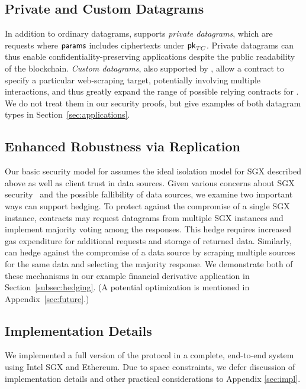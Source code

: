 \subsection{Private and Custom Datagrams}
\label{subsec:private_datagrams}
In addition to ordinary datagrams, \tc supports \emph{private datagrams}, which are requests where ${\sf params}$ includes ciphertexts under ${\sf pk}_{TC}$. Private datagrams can thus enable confidentiality-preserving applications despite the public readability of the blockchain.  \emph{Custom datagrams}, also supported by \tc, allow a contract to specify a particular web-scraping target, potentially involving multiple interactions, and thus greatly expand the range of possible relying contracts for \tc. We do not treat them in our security proofs, but give examples of both datagram types in Section~\ref{sec:applications}.

\subsection{Enhanced Robustness via Replication}
\label{subsec:enhanced_robustness}
Our basic security model for \tc assumes the ideal isolation model for SGX described above as well as client trust in data sources. Given various concerns about SGX security~\cite{sgxexplained,7163052} and the possible fallibility of data sources, we examine two important ways \tc can support hedging.
To protect against the compromise of a single SGX instance, contracts may request datagrams from multiple SGX instances and implement majority voting among the responses.
This hedge requires increased gas expenditure for additional requests and storage of returned data.
Similarly, \tc can hedge against the compromise of a data source by scraping multiple sources for the same data and selecting the majority response. We demonstrate both of these mechanisms in our example financial derivative application in Section~\ref{subsec:hedging}. (A potential optimization is mentioned in Appendix~\ref{sec:future}.)


\subsection{Implementation Details}
We implemented a full version of the \tc protocol in a complete, end-to-end system using Intel SGX and Ethereum. Due to space constraints, 
we defer discussion of implementation details and other practical considerations to 
Appendix \ref{sec:impl}.
